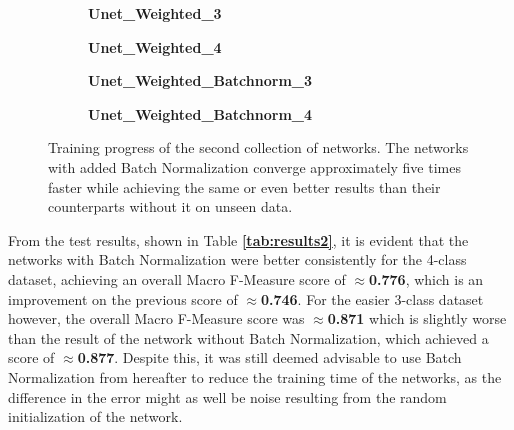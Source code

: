\begin {figure}[!ht]
	\begin {subfigure}[b]{0.4\linewidth}
		\scalebox{0.65}{}
		\caption{\textbf{Unet\_Weighted\_3}}
	\end {subfigure}\hspace{1.75cm}
	\begin {subfigure}[b]{0.4\linewidth}
		\scalebox{0.65}{}
		\caption{\textbf{Unet\_Weighted\_4}}
	\end {subfigure}

	\begin {subfigure}[b]{0.4\linewidth}
		\scalebox{0.65}{}
		\caption{\textbf{Unet\_Weighted\_Batchnorm\_3}}
	\end {subfigure}\hspace{1.75cm}
	\begin {subfigure}[b]{0.4\linewidth}
		\scalebox{0.65}{}
		\caption{\textbf{Unet\_Weighted\_Batchnorm\_4}}
	\end {subfigure}

		\caption[Training progress of the second collection of networks.]{Training progress of the second collection of networks. The networks with added Batch Normalization converge approximately five times faster while achieving the same or even better results than their counterparts without it on unseen data.}
		\label{fig:weighted_weighted_batchnorm_training}
\end {figure}

\noindent From the test results, shown in Table \textbf{\ref{tab:results2}}, it is evident that the networks with Batch Normalization were better consistently for the 4-class dataset, achieving an overall Macro F-Measure score of $\approx$\textbf{0.776}, which is an improvement on the previous score of $\approx$\textbf{0.746}. For the easier 3-class dataset however, the overall Macro F-Measure score was $\approx$\textbf{0.871} which is slightly worse than the result of the network without Batch Normalization, which achieved a score of $\approx$\textbf{0.877}. Despite this, it was still deemed advisable to use Batch Normalization from hereafter to reduce the training time of the networks, as the difference in the error might as well be noise resulting from the random initialization of the network.\\

